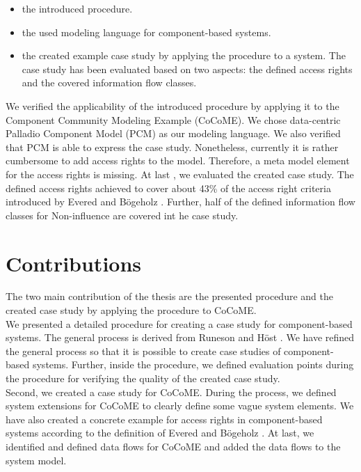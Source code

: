 \begin{itemize}
\item the introduced procedure.
\item the used modeling language for component-based systems.
\item the created example case study by applying the procedure to a system. The case study has been evaluated based on two aspects: the defined access rights and the covered information flow classes.
\end{itemize}
We verified the applicability of the introduced procedure by applying it to the Component Community Modeling Example (CoCoME). We chose data-centric Palladio Component Model (PCM) as our modeling language. We also verified that PCM is able to express the case study. Nonetheless, currently it is rather cumbersome to add access rights to the model. Therefore, a meta model element for the access rights is missing. At last , we evaluated the created case study. The defined access rights achieved to cover about 43\% of the access right criteria introduced by Evered and Bögeholz \cite{CaseStudyAndAccessrigths}. Further, half of the defined information flow classes for Non-influence \cite{Noninfluence} are covered int he case study.

\section{Contributions}
The two main contribution of the thesis are the presented procedure and the created case study by applying the procedure to CoCoME.\\
We presented a detailed procedure for creating a case study for component-based systems. The general process is derived from Runeson and Höst \cite{CaseStudysoftwaresystems}. We have refined the general process so that it is possible to create case studies of component-based systems. Further, inside the procedure, we defined evaluation points during the procedure for verifying the quality of the created case study. \\ 
Second, we created a case study for CoCoME. During the process, we defined system extensions for CoCoME to clearly define some vague system elements. We have also created a concrete example for access rights in component-based systems according to the definition of Evered and Bögeholz \cite{CaseStudyAndAccessrigths}. At last, we identified and defined data flows for CoCoME and added the data flows to the system model.
